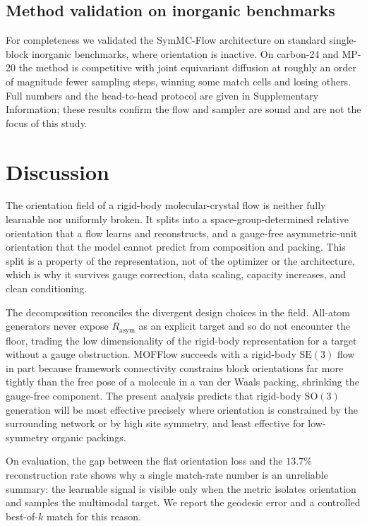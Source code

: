 \documentclass[11pt]{article}
\begin{document}
\subsection{Method validation on inorganic benchmarks}

For completeness we validated the SymMC-Flow architecture on standard
single-block inorganic benchmarks, where orientation is inactive. On carbon-24
and MP-20 the method is competitive with joint equivariant
diffusion\cite{jiao2023diffcsp} at roughly an order of magnitude fewer sampling
steps, winning some match cells and losing others. Full numbers and the
head-to-head protocol are given in Supplementary Information; these results
confirm the flow and sampler are sound and are not the focus of this study.

\section{Discussion}

The orientation field of a rigid-body molecular-crystal flow is neither fully
learnable nor uniformly broken. It splits into a space-group-determined relative
orientation that a flow learns and reconstructs, and a gauge-free
asymmetric-unit orientation that the model cannot predict from composition and
packing. This split is a property of the representation, not of the optimizer or
the architecture, which is why it survives gauge correction, data scaling,
capacity increases, and clean conditioning.

The decomposition reconciles the divergent design choices in the field. All-atom
generators\cite{jin2025oxtal,subramanian2026packflow} never expose
$R_{\text{asym}}$ as an explicit target and so do not encounter the floor,
trading the low dimensionality of the rigid-body representation for a target
without a gauge obstruction. MOFFlow\cite{kim2025mofflow} succeeds with a
rigid-body $\mathrm{SE}(3)$ flow in part because framework connectivity
constrains block orientations far more tightly than the free pose of a molecule
in a van der Waals packing, shrinking the gauge-free component. The present
analysis predicts that rigid-body $\mathrm{SO}(3)$ generation will be most
effective precisely where orientation is constrained by the surrounding network
or by high site symmetry, and least effective for low-symmetry organic packings.

On evaluation, the gap between the flat orientation loss and the $13.7\%$
reconstruction rate shows why a single match-rate number is an unreliable
summary\cite{martirossyan2025matching}: the learnable signal is visible only
when the metric isolates orientation and samples the multimodal target. We
report the geodesic error and a controlled best-of-$k$ match for this reason.
\end{document}
